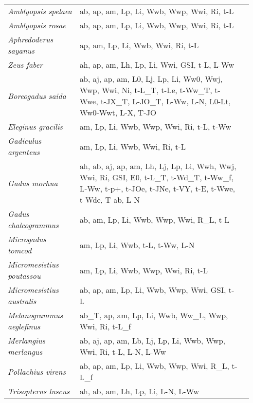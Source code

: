 {\begin{longtable}[c]{p{3.5cm}p{5.5cm}p{5.5cm}}
\emph{Amblyopsis spelaea} &  ab, ap, am, Lp, Li, Wwb, Wwp, Wwi, Ri, t-L & \citet{Poul1963} \\
\emph{Amblyopsis rosae} &  ab, ap, am, Lp, Li, Wwb, Wwp, Wwi, Ri, t-L & \citet{Poul1963,WhitCulv2012} \\
\emph{Aphredoderus sayanus} &  ap, am, Lp, Li, Wwb, Wwi, Ri, t-L & \citet{McCa2012,ShepHuish1978} \\
\emph{Zeus faber} &  ah, ap, am, Lh, Lp, Li, Wwi, GSI, t-L, L-Ww & \citet{IsmeArsl2013} \\
\emph{Boreogadus saida} &  ab, aj, ap, am, L0, Lj, Lp, Li, Ww0, Wwj, Wwp, Wwi, Ni, t-L\_T, t-Le, t-Ww\_T, t-Wwe, t-JX\_T, L-JO\_T, L-Ww, L-N, L0-Lt, Ww0-Wwt, L-X, T-JO & \citet{KentDros2016,Crai1982,DahlNahr2017,NahrVarp2014,WalkPaul2011,KunzFric2016,FeyWesl2017,HopTonn1997,BoucMoll2016} \\
\emph{Eleginus gracilis} &  am, Lp, Li, Wwb, Wwp, Wwi, Ri, t-L, t-Ww & \citet{Dats2016} \\
\emph{Gadiculus argenteus} &  am, Lp, Li, Wwb, Wwi, Ri, t-L & \citet{MunkNiel2005,Magn2007} \\
\emph{Gadus morhua} &  ah, ab, aj, ap, am, Lh, Lj, Lp, Li, Wwh, Wwj, Wwi, Ri, GSI, E0, t-L\_T, t-Wd\_T, t-Ww\_f, L-Ww, t-p+, t-JOe, t-JNe, t-VY, t-E, t-Wwe, t-Wde, T-ab, L-N & \citet{BuslSerg2010,FinnHend1995,OtteNyha1999,ThorWitt2010,KjesKlun1991,PaulKses2009,FinnFyhn1995,BjorStei2007,KjesWitt1998,McCoGeub2006} \\
\emph{Gadus chalcogrammus} &  ab, am, Lp, Li, Wwb, Wwp, Wwi, R\_L, t-L & \citet{LaiGund1987} \\
\emph{Microgadus tomcod} &  am, Lp, Li, Wwb, t-L, t-Ww, L-N & \citet{CouiCaba2011,SchaSher1960} \\
\emph{Micromesistius poutassou} &  am, Lp, Li, Wwb, Wwp, Wwi, Ri, t-L & \citet{Magn2007} \\
\emph{Micromesistius australis} &  ab, ap, am, Lp, Li, Wwb, Wwp, Wwi, GSI, t-L & \citet{ContArel2014} \\
\emph{Melanogrammus aeglefinus} &  ab\_T, ap, am, Lp, Li, Wwb, Ww\_L, Wwp, Wwi, Ri, t-L\_f & \citet{BollRijn2004} \\
\emph{Merlangius merlangus} &  ab, aj, ap, am, Lb, Lj, Lp, Li, Wwb, Wwp, Wwi, Ri, t-L, L-N, L-Ww & \citet{PovoDave2011,JoneHisl1972,ShawDiek2008,Last1978,HislHall1974} \\
\emph{Pollachius virens} &  ab, ap, am, Lp, Li, Wwb, Wwp, Wwi, R\_L, t-L\_f & \citet{BollRijn2004} \\
\emph{Trisopterus luscus} &  ah, ab, am, Lh, Lp, Li, L-N, L-Ww & \citet{AlonVerg2010,MetiIlky2008} \\

\end{longtable}}
